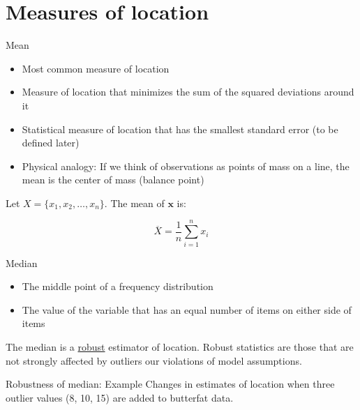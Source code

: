 \documentclass[presentation]{beamer}
\begin{document}
\section{Measures of location}
\label{sec:orgheadline14}
\begin{frame}[label={sec:orgheadline9}]{Mean}
\begin{itemize}
\item Most common measure of location
\item Measure of location that minimizes the sum of the squared deviations around it
\item Statistical measure of location that has the smallest standard error (to be defined later)
\item Physical analogy: If we think of observations as points of mass on a line, the mean is the center of mass (balance point)
\end{itemize}

Let \(X = \{x_1, x_2, \ldots, x_n\}\). The mean of \(\mathbf{x}\) is:

\[
\overline{X}= \frac{1}{n} \sum_{i=1}^n x_i 
\]
\end{frame}


\begin{frame}[label={sec:orgheadline10}]{Median}
\begin{itemize}
\item The middle point of a frequency distribution
\item The value of the variable that has an equal number of items on either side of items
\end{itemize}

The median is a \uline{robust} estimator of location. Robust statistics are those that are not strongly affected by outliers our violations of model assumptions.  
\end{frame}

\begin{frame}[label={sec:orgheadline11}]{Robustness of median: Example}
Changes in estimates of location when three outlier values (8, 10, 15) are added to butterfat data.
\end{frame}
\end{document}
